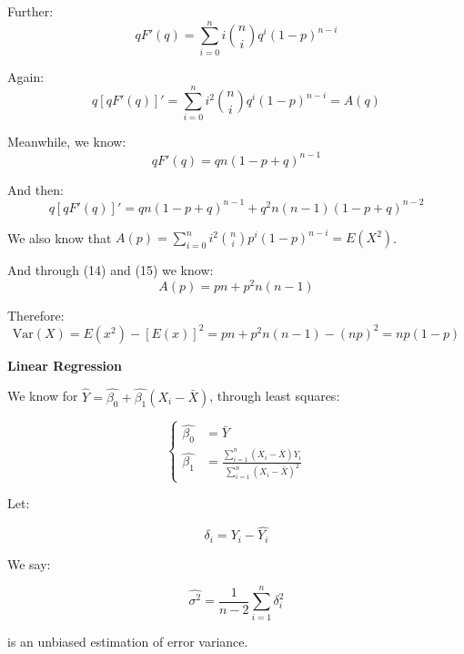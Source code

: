 \documentclass{article}
\newcommand{\Var}{\mathrm{Var}}
\begin{document}
Further:
\begin{equation*}
    qF'(q)=\sum_{i=0}^n i{n \choose i}q^{i}(1-p)^{n-i}
\end{equation*}

Again:
\begin{equation}
    q[qF'(q)]'=\sum_{i=0}^n i^2{n \choose i}q^i(1-p)^{n-i}=A(q)
\end{equation}

Meanwhile, we know:
\begin{equation*}
    qF'(q)=qn(1-p+q)^{n-1}
\end{equation*}

And then:
\begin{equation}
    q[qF'(q)]'=qn(1-p+q)^{n-1}+q^2n(n-1)(1-p+q)^{n-2}
\end{equation}

We also know that \(A(p)=\sum_{i=0}^ni^2{n \choose i}p^i(1-p)^{n-i}=E(X^2)\).

And through (14) and (15) we know:
\begin{equation}
    A(p)=pn+p^2n(n-1)
\end{equation}

Therefore:
\begin{equation}
    \Var(X)=E(x^2)-[E(x)]^2=pn+p^2n(n-1)-(np)^2=np(1-p)
\end{equation}

\textbf{Linear Regression}

We know for \(\hat{Y}=\hat{\beta_0}+\hat{\beta_1}(X_i-\bar{X})\), through least squares:

\begin{equation}
\left\{
\begin{split}
\hat{\beta_0}&=\bar{Y}\\
\hat{\beta_1}&=\frac{\sum_{i=1}^n(X_i-\bar{X})Y_i}{\sum_{i=1}^n(X_i-\bar{X})^2}
\end{split}
\right.
\end{equation}

Let:

\begin{equation*}
    \delta_i=Y_i-\hat{Y_i}
\end{equation*}

We say:

\begin{equation*}
    \hat{\sigma^2}=\frac{1}{n-2}\sum_{i=1}^n\delta_i^2
\end{equation*}

is an unbiased estimation of error variance.
\end{document}
